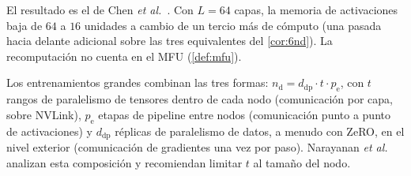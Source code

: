 El resultado es el de Chen \emph{et al.}~\cite{chen-checkpoint}. Con $L=64$ capas, la memoria de activaciones baja de $64$ a $16$ unidades a cambio de un tercio más de cómputo (una pasada hacia delante adicional sobre las tres equivalentes del \cref{cor:6nd}). La recomputación no cuenta en el MFU (\cref{def:mfu}).

\begin{observacion}[Paralelismo 3D]
Los entrenamientos grandes combinan las tres formas: $n_{\mathrm{d}}=d_{\mathrm{dp}}\cdot t\cdot p_{\mathrm{e}}$, con $t$ rangos de paralelismo de tensores dentro de cada nodo (comunicación por capa, sobre NVLink), $p_{\mathrm{e}}$ etapas de pipeline entre nodos (comunicación punto a punto de activaciones) y $d_{\mathrm{dp}}$ réplicas de paralelismo de datos, a menudo con ZeRO, en el nivel exterior (comunicación de gradientes una vez por paso). Narayanan \emph{et al.}~\cite[§3]{narayanan} analizan esta composición y recomiendan limitar $t$ al tamaño del nodo.
\end{observacion}

